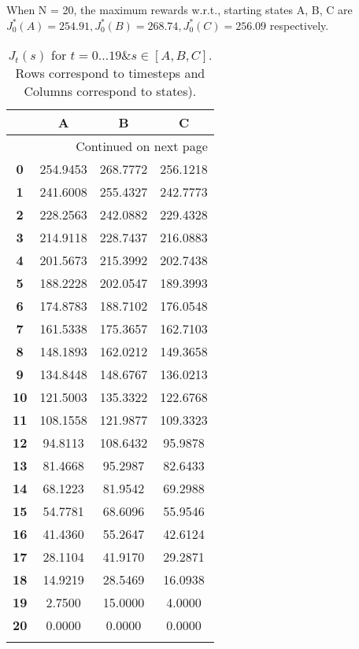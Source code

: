 \documentclass{article}
\begin{document}
When N = 20, the maximum rewards w.r.t., starting states A, B, C are $J_0^*(A) = 254.91, J_0^*(B) = 268.74, J_0^*(C) = 256.09$ respectively.\\

\begin{longtable}{|c|c|c|c|}
\toprule
{} &         A &         B &         C \\
\midrule
\endhead
\midrule
\multicolumn{4}{r}{{Continued on next page}} \\
\midrule
\endfoot

\bottomrule
\endlastfoot
\textbf{0 } &  254.9453 &  268.7772 &  256.1218 \\\hline
\textbf{1 } &  241.6008 &  255.4327 &  242.7773 \\\hline
\textbf{2 } &  228.2563 &  242.0882 &  229.4328 \\\hline
\textbf{3 } &  214.9118 &  228.7437 &  216.0883 \\\hline
\textbf{4 } &  201.5673 &  215.3992 &  202.7438 \\\hline
\textbf{5 } &  188.2228 &  202.0547 &  189.3993 \\\hline
\textbf{6 } &  174.8783 &  188.7102 &  176.0548 \\\hline
\textbf{7 } &  161.5338 &  175.3657 &  162.7103 \\\hline
\textbf{8 } &  148.1893 &  162.0212 &  149.3658 \\\hline
\textbf{9 } &  134.8448 &  148.6767 &  136.0213 \\\hline
\textbf{10} &  121.5003 &  135.3322 &  122.6768 \\\hline
\textbf{11} &  108.1558 &  121.9877 &  109.3323 \\\hline
\textbf{12} &   94.8113 &  108.6432 &   95.9878 \\\hline
\textbf{13} &   81.4668 &   95.2987 &   82.6433 \\\hline
\textbf{14} &   68.1223 &   81.9542 &   69.2988 \\\hline
\textbf{15} &   54.7781 &   68.6096 &   55.9546 \\\hline
\textbf{16} &   41.4360 &   55.2647 &   42.6124 \\\hline
\textbf{17} &   28.1104 &   41.9170 &   29.2871 \\\hline
\textbf{18} &   14.9219 &   28.5469 &   16.0938 \\\hline
\textbf{19} &    2.7500 &   15.0000 &    4.0000 \\\hline
\textbf{20} &    0.0000 &    0.0000 &    0.0000 \\\hline
\caption{$J_t(s)$ for $t=0 \dots 19 \& s \in [A, B, C]$. Rows correspond to timesteps and Columns correspond to states).}
\end{longtable}
\end{document}
